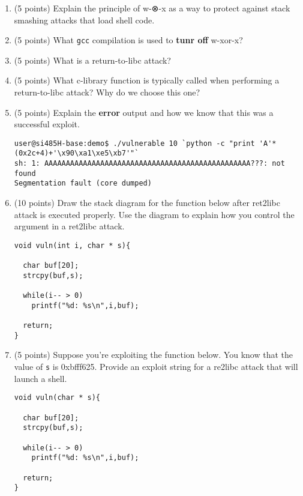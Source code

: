\documentclass{article}[9pt]
\begin{document}
\begin{enumerate}
\item (5 points) Explain the principle of w-⊗-x as a way to protect against stack
smashing attacks that load shell code.

\item (5 points) What \texttt{gcc} compilation is used to \textbf{tunr off} w-xor-x?

\item (5 points) What is a return-to-libc attack?

\item (5 points) What c-library function is typically called when performing a
return-to-libc attack? Why do we choose this one?

\item (5 points) Explain the \textbf{error} output and how we know that this was a successful exploit.

\begin{verbatim}
user@si485H-base:demo$ ./vulnerable 10 `python -c "print 'A'*(0x2c+4)+'\x90\xa1\xe5\xb7'"`
sh: 1: AAAAAAAAAAAAAAAAAAAAAAAAAAAAAAAAAAAAAAAAAAAAAAAA???: not found
Segmentation fault (core dumped)
\end{verbatim}

\item (10 points) Draw the stack diagram for the function below after ret2libc
attack is executed properly. Use the diagram to explain how you
control the argument in a ret2libc attack.

\begin{verbatim}
void vuln(int i, char * s){

  char buf[20];
  strcpy(buf,s);

  while(i-- > 0)
    printf("%d: %s\n",i,buf);

  return;
}
\end{verbatim}

\item (5 points) Suppose you're exploiting the function below. You know that the
value of \texttt{s} is 0xbfff625. Provide an exploit string for a
re2libc attack that will launch a shell.

\begin{verbatim}
void vuln(char * s){

  char buf[20];
  strcpy(buf,s);

  while(i-- > 0)
    printf("%d: %s\n",i,buf);

  return;
}
\end{verbatim}


\end{enumerate}
\end{document}
